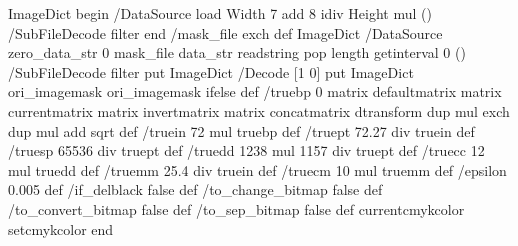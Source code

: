 {{{{    ImageDict begin
      /DataSource load Width 7 add 8 idiv Height mul
      () /SubFileDecode filter
    end /mask_file exch def
    ImageDict /DataSource {
      zero_data_str 0 mask_file data_str readstring pop length getinterval
    } 0 () /SubFileDecode filter put
    ImageDict /Decode [1 0] put
    ImageDict ori_imagemask
  } {ori_imagemask} ifelse
} def
%
/truebp {0 matrix defaultmatrix matrix currentmatrix
  matrix invertmatrix matrix concatmatrix dtransform
  dup mul exch dup mul add sqrt} def
/truein {72 mul truebp} def
/truept {72.27 div truein} def
/truesp {65536 div truept} def
/truedd {1238 mul 1157 div truept} def
/truecc {12 mul truedd} def
/truemm {25.4 div truein} def
/truecm {10 mul truemm} def
%
/epsilon 0.005 def
/if_delblack false def
/to_change_bitmap false def
/to_convert_bitmap false def
/to_sep_bitmap false def
%
currentcmykcolor setcmykcolor
%
end %
}}%
\def\PSbegingroup {\begingroup \special{ps: save }}
\def\PSendgroup {\special{ps: restore }\endgroup}
%
\def\forcolor #1{\def\thecolor{#1}}
\def\checkcolor {\thecolor\space count 4 lt {(Not CMYK ) print} if
  k_ sub abs epsilon le exch
  y_ sub abs epsilon le and exch
  m_ sub abs epsilon le and exch
  c_ sub abs epsilon le and }
%
\def\changefill #1{%
   \edef\changefills{\changefills \checkcolor
     {#1 hax_setcmykcolor} if }}
\def\changestroke #1{%
   \edef\changestrokes{\changestrokes \checkcolor
     {#1 hax_setcmykcolor} if }}
\def\changecolor #1{%
   \edef\changecolors{\changecolors \checkcolor
     {#1 hax_setcmykcolor} if }}
\def\addfill #1{%
   \edef\addfills{\addfills \checkcolor {addfill} if }%
   \edef\changefills{\changefills \checkcolor
     {#1 hax_setcmykcolor} if }}
\def\adddownstroke #1{%
   \edef\addstrokes{\addstrokes \checkcolor {adddownstroke} if }%
   \edef\changestrokes{\changestrokes \checkcolor
     {#1 hax_setcmykcolor} if }}
\def\addstroke #1{%
   \edef\addstrokes{\addstrokes \checkcolor {addstroke} if }%
   \edef\changestrokes{\changestrokes \checkcolor
     {#1 hax_setcmykcolor} if }}
\def\addcolor #1{\addstroke{#1}\addfill{#1}}
\def\delfill {%
   \edef\delfills{\delfills \checkcolor {delfill} if }}
\def\delstroke {%
   \edef\delstrokes{\delstrokes \checkcolor {delstroke} if }}
\def\delcolor {%
   \edef\delcolors{\delcolors \checkcolor {delfill delstroke} if }}
\def\strokehook #1{%
   \edef\strokehooks{\strokehooks \checkcolor {#1} if }}

